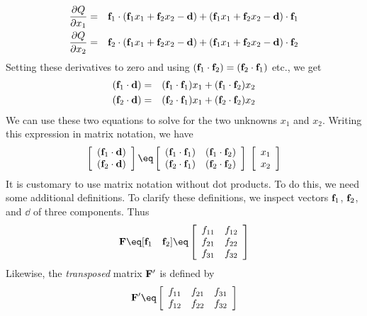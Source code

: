 \begin{eqnarray}
 {\partial Q \over \partial x_1} &= &
                    {\bf f}_1  \cdot ({\bf f}_1 x_1 + {\bf f}_2 x_2 -{\bf d} )  
                         +        ({\bf f}_1 x_1 + {\bf f}_2 x_2 -{\bf d} ) \cdot  {\bf f}_1
 \\
 {\partial Q \over \partial x_2} &= &
                            {\bf f}_2  \cdot ({\bf f}_1 x_1 + {\bf f}_2 x_2 -{\bf d} )  
                         +   ({\bf f}_1 x_1 + {\bf f}_2 x_2 -{\bf d} ) \cdot  {\bf f}_2
\end{eqnarray}
Setting these derivatives to zero and using
$({\bf f}_1 \cdot {\bf f}_2)=({\bf f}_2 \cdot {\bf f}_1)$ etc.,
we get
\begin{eqnarray}
({\bf f}_1 \cdot {\bf d} ) &= & ({\bf f}_1 \cdot {\bf f}_1) x_1 + ({\bf f}_1 \cdot {\bf f}_2)  x_2  \\
({\bf f}_2 \cdot {\bf d} ) &= & ({\bf f}_2 \cdot {\bf f}_1) x_1 + ({\bf f}_2 \cdot {\bf f}_2)  x_2
\end{eqnarray}
We can use these two equations to solve for
the two unknowns $x_1$ and $x_2$.
Writing this expression in matrix notation, we have
\begin{equation}
\left[ 
\begin{array}{c}
  (\ff_1 \cdot \dd ) \\ 
  (\ff_2 \cdot \dd ) \end{array} \right] 
\eq \left[ 
\begin{array}{ccc}
  (\ff_1 \cdot \ff_1) & (\ff_1 \cdot \ff_2)  \\
  (\ff_2 \cdot \ff_1) & (\ff_2 \cdot \ff_2)  \end{array} \right] 
\; \left[ 
\begin{array}{c}
  x_1 \\ 
  x_2 \end{array} \right]  \label{eqn:2by2}
\end{equation}
It is customary to use matrix notation without dot products.
To do this, we need some additional definitions.
To clarify these definitions,
we inspect vectors 
${\bf f}_1$, ${\bf f}_2$, and $\dd$ of three components.
Thus 
\begin{equation}
\bold F \eq [ \ff_1 \quad \ff_2 ] \eq 
\left[ 
\begin{array}{ccc}
  f_{11} & f_{12}  \\
  f_{21} & f_{22}  \\
  f_{31} & f_{32}  \end{array} \right] 
\end{equation}
Likewise, the {\it transposed} matrix $\bold F'$ is defined by
\begin{equation}
\bold F' \eq
\left[ 
\begin{array}{ccc}
  f_{11} & f_{21} & f_{31}  \\
  f_{12} & f_{22} & f_{32}  \end{array} \right] 
\end{equation}
